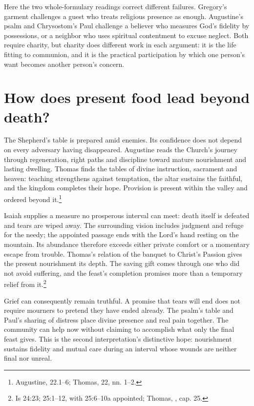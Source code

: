 Here the two whole-formulary readings correct different failures. Gregory's garment challenges a guest who treats religious presence as enough. Augustine's psalm and Chrysostom's Paul challenge a believer who measures God's fidelity by possessions, or a neighbor who uses spiritual contentment to excuse neglect. Both require charity, but charity does different work in each argument: it is the life fitting to communion, and it is the practical participation by which one person's want becomes another person's concern.

\section{How does present food lead beyond death?}
The Shepherd's table is prepared amid enemies. Its confidence does not depend on every adversary having disappeared. Augustine reads the Church's journey through regeneration, right paths and discipline toward mature nourishment and lasting dwelling. Thomas finds the tables of divine instruction, sacrament and heaven: teaching strengthens against temptation, the altar sustains the faithful, and the kingdom completes their hope. Provision is present within the valley and ordered beyond it.\footnote{Augustine,  22.1--6; Thomas,  22, nn. 1--2.}

Isaiah supplies a measure no prosperous interval can meet: death itself is defeated and tears are wiped away. The surrounding vision includes judgment and refuge for the needy; the appointed passage ends with the Lord's hand resting on the mountain. Its abundance therefore exceeds either private comfort or a momentary escape from trouble. Thomas's relation of the banquet to Christ's Passion gives the present nourishment its depth. The saving gift comes through one who did not avoid suffering, and the feast's completion promises more than a temporary relief from it.\footnote{Is 24:23; 25:1--12, with 25:6--10a appointed; Thomas, , cap. 25.}

Grief can consequently remain truthful. A promise that tears will end does not require mourners to pretend they have ended already. The psalm's table and Paul's sharing of distress place divine presence and real pain together. The community can help now without claiming to accomplish what only the final feast gives. This is the second interpretation's distinctive hope: nourishment sustains fidelity and mutual care during an interval whose wounds are neither final nor unreal.

